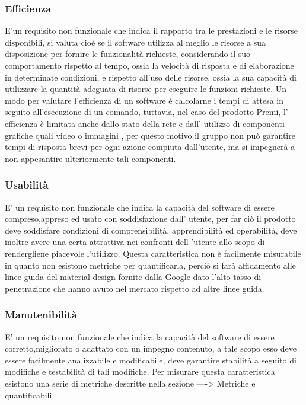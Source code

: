 \subsubsection{Efficienza}

E'un requisito non funzionale che indica il rapporto tra le prestazioni e le risorse disponibili, si valuta cioè se il software utilizza al meglio le risorse a sua disposizione per fornire le funzionalità richieste, considerando il suo comportamento rispetto al tempo, ossia la velocità di risposta e di elaborazione in determinate condizioni, e rispetto all’uso delle risorse, ossia la sua capacità di utilizzare la quantità adeguata di risorse per eseguire le funzioni richieste. Un modo per valutare l’efficienza di un software è calcolarne i tempi di attesa in seguito all’esecuzione di un comando, tuttavia, nel caso del prodotto Premi, l' efficienza è limitata anche dallo stato della rete e dall' utilizzo di componenti grafiche quali video o immagini , per questo motivo il gruppo non può garantire tempi di risposta brevi per ogni azione compiuta dall’utente, ma si impegnerà a non appesantire ulteriormente tali componenti.

\subsubsection{Usabilità}

E' un requisito non funzionale che indica la capacità del software di essere compreso,appreso ed usato con soddisfazione dall' utente, per far ciò il prodotto deve soddisfare condizioni di comprensibilità, apprendibilità ed operabilità, deve inoltre avere una certa attrattiva nei confronti dell 'utente allo scopo di rendergliene piacevole l’utilizzo. Questa caratteristica non è facilmente misurabile in quanto non esistono metriche per quantificarla, perciò si farà affidamento alle linee guida del material design fornite dalla Google dato l'alto tasso di penetrazione che hanno avuto nel mercato rispetto ad altre linee guida.

\subsubsection{Manutenibilità}
E' un requisito non funzionale che indica la capacità del software di essere corretto,migliorato o adattato con un impegno contenuto, a tale scopo esso deve essere facilmente analizzabile e modificabile, deve garantire stabilità a seguito di modifiche e testabilità di tali modifiche. Per misurare questa caratteristica esistono una serie di metriche descritte nella sezione ----> Metriche e quantificabili 

